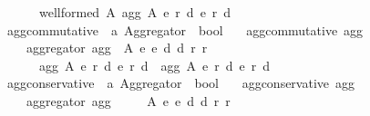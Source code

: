 \begin{isabellebody}
\ \ \ \ \ \ well{\isacharunderscore}{\kern0pt}formed\ A\ {\isacharparenleft}{\kern0pt}agg\ A\ {\isacharparenleft}{\kern0pt}e{}{\isacharcomma}{\kern0pt}\ r{}{\isacharcomma}{\kern0pt}\ d{}{\isacharparenright}{\kern0pt}\ {\isacharparenleft}{\kern0pt}e{}{\isacharcomma}{\kern0pt}\ r{}{\isacharcomma}{\kern0pt}\ d{}{\isacharparenright}{\kern0pt}{\isacharparenright}{\kern0pt}{\isachardoublequoteclose}%
\isadelimdocument
%
\endisadelimdocument
%
\isatagdocument
%
\isamarkuptrue%
%
\endisatagdocument
{\isafolddocument}%
%
\isadelimdocument
%
\endisadelimdocument
{}\isamarkupfalse%
\ agg{\isacharunderscore}{\kern0pt}commutative\ {\isacharcolon}{\kern0pt}{\isacharcolon}{\kern0pt}\ {\isachardoublequoteopen}{\isacharprime}{\kern0pt}a\ Aggregator\ {\isasymRightarrow}\ bool{\isachardoublequoteclose}\ \isanewline
\ \ {\isachardoublequoteopen}agg{\isacharunderscore}{\kern0pt}commutative\ agg\ {\isasymequiv}\isanewline
\ \ \ \ aggregator\ agg\ {\isasymand}\ {\isacharparenleft}{\kern0pt}{\isasymforall}A\ e{}\ e{}\ d{}\ d{}\ r{}\ r{}{\isachardot}{\kern0pt}\isanewline
\ \ \ \ \ \ agg\ A\ {\isacharparenleft}{\kern0pt}e{}{\isacharcomma}{\kern0pt}\ r{}{\isacharcomma}{\kern0pt}\ d{}{\isacharparenright}{\kern0pt}\ {\isacharparenleft}{\kern0pt}e{}{\isacharcomma}{\kern0pt}\ r{}{\isacharcomma}{\kern0pt}\ d{}{\isacharparenright}{\kern0pt}\ {\isacharequal}{\kern0pt}\ agg\ A\ {\isacharparenleft}{\kern0pt}e{}{\isacharcomma}{\kern0pt}\ r{}{\isacharcomma}{\kern0pt}\ d{}{\isacharparenright}{\kern0pt}\ {\isacharparenleft}{\kern0pt}e{}{\isacharcomma}{\kern0pt}\ r{}{\isacharcomma}{\kern0pt}\ d{}{\isacharparenright}{\kern0pt}{\isacharparenright}{\kern0pt}{\isachardoublequoteclose}\isanewline
\isanewline
{}\isamarkupfalse%
\ agg{\isacharunderscore}{\kern0pt}conservative\ {\isacharcolon}{\kern0pt}{\isacharcolon}{\kern0pt}\ {\isachardoublequoteopen}{\isacharprime}{\kern0pt}a\ Aggregator\ {\isasymRightarrow}\ bool{\isachardoublequoteclose}\ \isanewline
\ \ {\isachardoublequoteopen}agg{\isacharunderscore}{\kern0pt}conservative\ agg\ {\isasymequiv}\isanewline
\ \ \ \ aggregator\ agg\ {\isasymand}\isanewline
\ \ \ \ {\isacharparenleft}{\kern0pt}{\isasymforall}A\ e{}\ e{}\ d{}\ d{}\ r{}\ r{}{\isachardot}{\kern0pt}\isanewline

\end{isabellebody}
